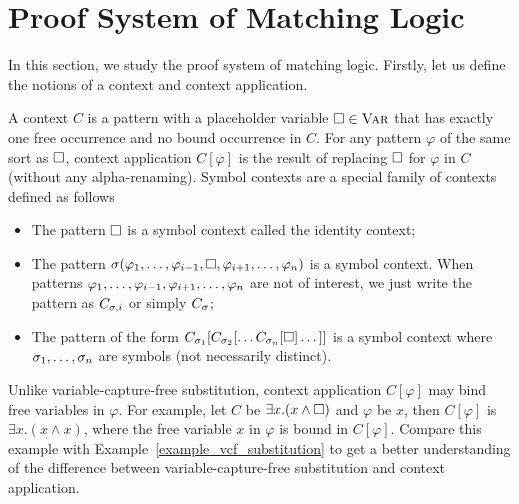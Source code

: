 \documentclass{amsart}
\begin{document}
\section{Proof System of Matching Logic}

In this section,
we study the proof system of matching logic.
Firstly, let us define the notions of a context and context application.

\begin{definition}
A context $C$ is a pattern with a placeholder variable
$\square \in \textnormal{\textsc{Var}}$ that has exactly one free occurrence
and no bound occurrence in $C$.
For any pattern $\varphi$ of the same sort as $\square$,
context application $C[\varphi]$ is the result of
replacing $\square$ for $\varphi$ in $C$ (without any alpha-renaming).
Symbol contexts are a special family of contexts defined as follows
\begin{itemize}
\item The pattern $\square$ is a symbol context called the identity context;
\item The pattern
      $\sigma(\varphi_1 ,\dots, \varphi_{i-1}, 
              \square , 
              \varphi_{i+1} ,\dots, \varphi_n)$
      is a symbol context.
      When patterns 
      $\varphi_1 ,\dots, \varphi_{i-1},\\ \varphi_{i+1} ,\dots, \varphi_n$
      are not of interest,
      we just write the pattern as $C_{\sigma,i}$ or simply $C_{\sigma}$;
\item The pattern of the form
      $
      C_{\sigma_1}[C_{\sigma_2}[\dots  C_{\sigma_n}[\square] \dots]]
      $
      is a symbol context
      where $\sigma_1 ,\dots, \sigma_n$ are symbols (not necessarily distinct).
\end{itemize}
\end{definition}

\begin{remark}
Unlike variable-capture-free substitution,
context application $C[\varphi]$ may bind free variables in $\varphi$.
For example,
let $C$ be $\exists x . (x \wedge \square)$ and $\varphi$ be $x$,
then $C[\varphi]$ is $\exists x . (x \wedge x)$, 
where the free variable $x$ in $\varphi$
is bound in $C[\varphi]$.
Compare this example with Example~\ref{example_vcf_substitution} to get
a better understanding of
the difference between variable-capture-free substitution and context 
application.
\end{remark}
\end{document}
